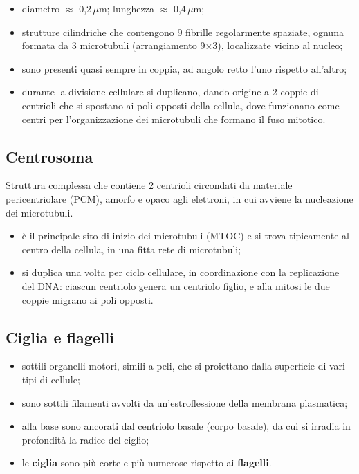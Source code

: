 \begin{itemize}
  \item diametro $\approx$ 0,2\,$\mu$m; lunghezza $\approx$ 0,4\,$\mu$m;
  \item strutture cilindriche che contengono 9 fibrille regolarmente spaziate, ognuna formata da 3 microtubuli (arrangiamento 9$\times$3), localizzate vicino al nucleo;
  \item sono presenti quasi sempre in coppia, ad angolo retto l'uno rispetto all'altro;
  \item durante la divisione cellulare si duplicano, dando origine a 2 coppie di centrioli che si spostano ai poli opposti della cellula, dove funzionano come centri per l'organizzazione dei microtubuli che formano il fuso mitotico.
\end{itemize}

\subsection{Centrosoma}

Struttura complessa che contiene 2 centrioli circondati da materiale pericentriolare (PCM), amorfo e opaco agli elettroni, in cui avviene la nucleazione dei microtubuli.
\begin{itemize}
  \item è il principale sito di inizio dei microtubuli (MTOC) e si trova tipicamente al centro della cellula, in una fitta rete di microtubuli;
  \item si duplica una volta per ciclo cellulare, in coordinazione con la replicazione del DNA: ciascun centriolo genera un centriolo figlio, e alla mitosi le due coppie migrano ai poli opposti.
\end{itemize}

\subsection{Ciglia e flagelli}

\begin{itemize}
  \item sottili organelli motori, simili a peli, che si proiettano dalla superficie di vari tipi di cellule;
  \item sono sottili filamenti avvolti da un'estroflessione della membrana plasmatica;
  \item alla base sono ancorati dal centriolo basale (corpo basale), da cui si irradia in profondità la radice del ciglio;
  \item le \textbf{ciglia} sono più corte e più numerose rispetto ai \textbf{flagelli}.
\end{itemize}

